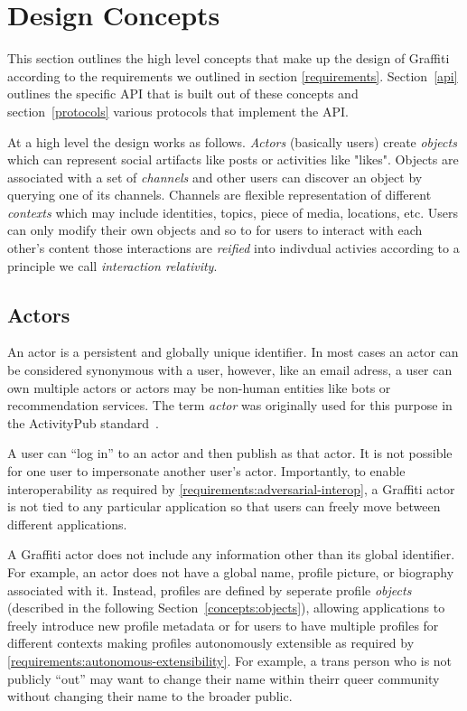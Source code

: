 \section{Design Concepts}

This section outlines the high level concepts that make up the design of Graffiti
according to the requirements we outlined in section \ref{requirements}.
Section~\ref{api} outlines the specific API that is built out of these
concepts and section~\ref{protocols} various protocols that implement the API.

At a high level the design works as follows.
\emph{Actors} (basically users) create \emph{objects} which can represent
social artifacts like posts or activities like "likes".
Objects are associated with a set of \emph{channels} and other users can
discover an object by querying one of its channels. Channels are flexible representation
of different \emph{contexts} which may include identities, topics, piece of media, locations, etc.
Users can only modify their own objects and so to for users to interact with each other's content
those interactions are \emph{reified} into indivdual
activies according to a principle we call \emph{interaction relativity}.

\subsection{Actors}

An actor is a persistent and globally unique identifier.
In most cases an actor can be considered synonymous with a user,
however, like an email adress, a user can own multiple actors
or actors may be non-human entities like bots or recommendation services.
The term \emph{actor} was originally used for this purpose
in the ActivityPub standard~\cite{activitypub}.

A user can ``log in'' to an actor and then publish as that actor.
It is not possible for one user to impersonate another user's actor.
Importantly, to enable interoperability
as required by \ref{requirements:adversarial-interop},
a Graffiti actor is not tied to any particular application so that users can freely move between
different applications.

A Graffiti actor does not include any information other than its
global identifier. For example, an actor does not have a global
name, profile picture, or biography associated with it.
Instead, profiles are defined by seperate profile \emph{objects}
(described in the following Section~\ref{concepts:objects}),
allowing applications to freely introduce new profile
metadata or for users to have multiple profiles for different contexts
making profiles autonomously extensible as required by \ref{requirements:autonomous-extensibility}.
For example, a trans person who is not publicly ``out'' may want to
change their name within theirr queer community without
changing their name to the broader public.

